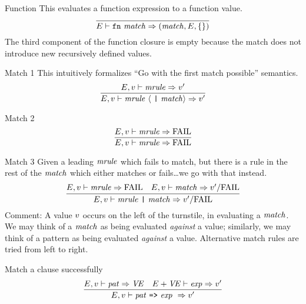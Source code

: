 \begin{inference-rule}{Function}
This evaluates a function expression to a function value.
\begin{equation}\label{rule:dynamic-core:funexp}
\vcenter{\infer{\E\ts\fnexp\ra(\match,\E,\emptymap)}
  {}}
\end{equation}
The third component of the function closure is empty because the
match does not introduce new recursively defined values.
\end{inference-rule}


\begin{inference-rule}{Match 1}
This intuitively formalizes ``Go with the first match possible'' semantics.
\begin{equation}\label{rule:dynamic-core:match1}
\vcenter{\infer{\E,\V\ts\longmatch\ra\V'}{\E,\V\ts\mrule\ra\V'}}
\end{equation}
\end{inference-rule}

\begin{inference-rule}{Match 2}
\begin{equation}\label{rule:dynamic-core:match2}
\vcenter{\infer{\E,\V\ts\mrule\ra\FAIL}{\E,\V\ts\mrule\ra\FAIL}}
\end{equation}
\end{inference-rule}

\begin{inference-rule}{Match 3}
Given a leading $\textit{mrule\/}$ which fails to match, but there is a rule in
the rest of the $\textit{match\/}$ which either matches or fails\dots we go with
that instead.
\begin{equation}\label{rule:dynamic-core:match3}
\vcenter{\infer{\E,\V\ts\longmatcha\ra\V'/\FAIL}
  {\E,\V\ts\mrule\ra\FAIL
    & \E,\V\ts\match\ra\V'/\FAIL}}
\end{equation}
Comment: A value $v$ occurs on the left of the turnstile, in evaluating
a $\textit{match\/}$. We may think of a $\textit{match\/}$ as being evaluated \emph{against}
a value; similarly, we may think of a pattern as being evaluated
\emph{against} a value. Alternative match rules are tried from left to
right.
\end{inference-rule}


\begin{inference-rule}{Match a clause successfully}
\begin{equation}\label{rule:dynamic-core:mrule1}
\vcenter{\infer{\E,\V\ts\longmrule\ \ra\V'}
  {\E,\V\ts\pat\ra\VE
    & \E+\VE\ts\exp\ra\V'}}
\end{equation}
\end{inference-rule}

